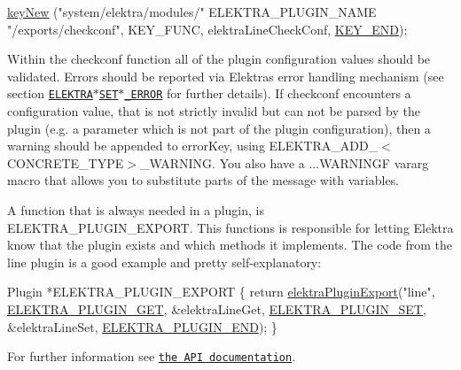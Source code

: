 \begin{DoxyCode}
\hyperlink{group__key_gad23c65b44bf48d773759e1f9a4d43b89}{keyNew} (\textcolor{stringliteral}{"system/elektra/modules/"} ELEKTRA\_PLUGIN\_NAME \textcolor{stringliteral}{"/exports/checkconf"}, KEY\_FUNC, 
      elektraLineCheckConf, \hyperlink{group__key_gga9b703ca49f48b482def322b77d3e6bc8aa8adb6fcb92dec58fb19410eacfdd403}{KEY\_END});
\end{DoxyCode}


Within the {\ttfamily checkconf} function all of the plugin configuration values should be validated. Errors should be reported via Elektra\textquotesingle{}s error handling mechanism (see section \href{#elektra_set_concrete_error}{\tt E\+L\+E\+K\+T\+R\+A$\ast$\+S\+E\+T$\ast$\+\_\+\+E\+R\+R\+OR} for further details). If {\ttfamily checkconf} encounters a configuration value, that is not strictly invalid but can not be parsed by the plugin (e.\+g. a parameter which is not part of the plugin configuration), then a warning should be appended to {\ttfamily error\+Key}, using {\ttfamily E\+L\+E\+K\+T\+R\+A\+\_\+\+A\+D\+D\+\_\+$<$C\+O\+N\+C\+R\+E\+T\+E\+\_\+\+T\+Y\+PE$>$\+\_\+\+W\+A\+R\+N\+I\+NG}. You also have a {\ttfamily ...W\+A\+R\+N\+I\+N\+GF} vararg macro that allows you to substitute parts of the message with variables.

A function that is always needed in a plugin, is {\ttfamily E\+L\+E\+K\+T\+R\+A\+\_\+\+P\+L\+U\+G\+I\+N\+\_\+\+E\+X\+P\+O\+RT}. This functions is responsible for letting Elektra know that the plugin exists and which methods it implements. The code from the line plugin is a good example and pretty self-\/explanatory\+:


\begin{DoxyCode}
Plugin *ELEKTRA\_PLUGIN\_EXPORT
\{
        \textcolor{keywordflow}{return} \hyperlink{group__plugin_ga8dd092048e972a3f0c9c9f54eb41576e}{elektraPluginExport}(\textcolor{stringliteral}{"line"},
        \hyperlink{kdbplugin_8h_afed89ef026fb0622918a5de020de7814a3d5f4a887e68878f1cc3a75985194204}{ELEKTRA\_PLUGIN\_GET}, &elektraLineGet,
        \hyperlink{kdbplugin_8h_afed89ef026fb0622918a5de020de7814a85c9545261cf0bcc932616e67ea3b70a}{ELEKTRA\_PLUGIN\_SET}, &elektraLineSet,
        \hyperlink{kdbplugin_8h_afed89ef026fb0622918a5de020de7814a64a0bc789482284d9fd27ce974e0959a}{ELEKTRA\_PLUGIN\_END});
\}
\end{DoxyCode}


For further information see \href{https://doc.libelektra.org/api/current/html/group__plugin.html}{\tt the A\+PI documentation}.

